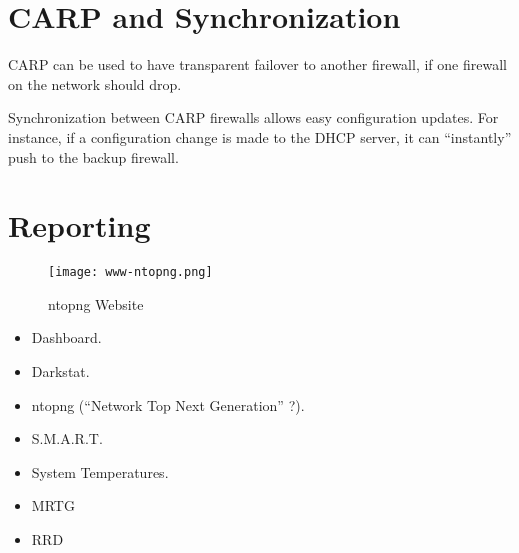 \section{CARP and Synchronization}
CARP can be used to have transparent failover to another firewall, if one
firewall on the network should drop.

Synchronization between CARP firewalls allows easy configuration updates. For
instance, if a configuration change is made to the DHCP server, it can
``instantly'' push to the backup firewall.


\section{Reporting}

\begin{figure}[h!]
\begin{center}
\texttt{[image: www-ntopng.png]}
 \caption{ntopng Website}
 \label{fig:www-ntopng}
\end{center}
\end{figure}

\begin{itemize}
 \item Dashboard.
 \item Darkstat.
 \item ntopng (``Network Top Next Generation'' ?).
 \item S.M.A.R.T.
 \item System Temperatures.
 \item MRTG
 \item RRD
\end{itemize}


